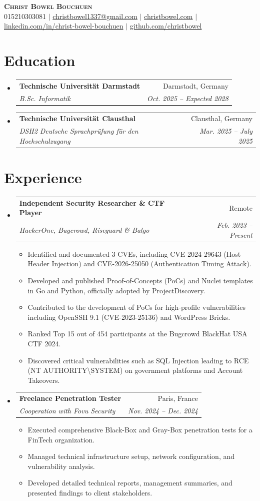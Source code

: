 \documentclass[letterpaper,11pt]{article}
\makeatletter
\newcommand{\resumeItem}[1]{
  \item\small{{#1 \vspace{-2pt}}}
}
\newcommand{\resumeSubheading}[4]{
  \vspace{-2pt}\item
    \begin{tabular*}{0.97\textwidth}[t]{l@{\extracolsep{\fill}}r}
      \textbf{#1} & #2 \\
      \textit{\small#3} & \textit{\small #4} \\
    \end{tabular*}\vspace{-7pt}
}
\newcommand{\resumeSubHeadingListStart}{\begin{itemize}[leftmargin=0.15in, label={}]}
\newcommand{\resumeSubHeadingListEnd}{\end{itemize}}
\newcommand{\resumeItemListStart}{\begin{itemize}}
\newcommand{\resumeItemListEnd}{\end{itemize}\vspace{-5pt}}
\makeatother
\begin{document}
\begin{center}
    \textbf{\Huge \scshape Christ Bowel Bouchuen} \\ \vspace{1pt}
    \small 015210303081 $|$ \href{mailto:christbowel1337@gmail.com}{christbowel1337@gmail.com} $|$ 
    \href{https://christbowel.com}{christbowel.com} $|$
    \href{https://linkedin.com/in/christ-bowel-bouchuen-207a76251}{linkedin.com/in/christ-bowel-bouchuen} $|$
    \href{https://github.com/christbowel}{github.com/christbowel}
\end{center}

\section{Education}
  \resumeSubHeadingListStart
    \resumeSubheading{Technische Universität Darmstadt}{Darmstadt, Germany}{B.Sc. Informatik}{Oct. 2025 -- Expected 2028}
    \resumeSubheading{Technische Universität Clausthal}{Clausthal, Germany}{DSH2 Deutsche Sprachprüfung für den Hochschulzugang}{Mar. 2025 -- July 2025}
  \resumeSubHeadingListEnd

\section{Experience}
  \resumeSubHeadingListStart
    \resumeSubheading{Independent Security Researcher \& CTF Player}{Remote}{HackerOne, Bugcrowd, Riseguard \& Balgo}{Feb. 2023 -- Present}
    \resumeItemListStart
        \resumeItem{Identified and documented 3 CVEs, including CVE-2024-29643 (Host Header Injection) and CVE-2026-25050 (Authentication Timing Attack).}
        \resumeItem{Developed and published Proof-of-Concepts (PoCs) and Nuclei templates in Go and Python, officially adopted by ProjectDiscovery.}
        \resumeItem{Contributed to the development of PoCs for high-profile vulnerabilities including OpenSSH 9.1 (CVE-2023-25136) and WordPress Bricks.}
        \resumeItem{Ranked Top 15 out of 454 participants at the Bugcrowd BlackHat USA CTF 2024.}
        \resumeItem{Discovered critical vulnerabilities such as SQL Injection leading to RCE (NT AUTHORITY\textbackslash{}SYSTEM) on government platforms and Account Takeovers.}
    \resumeItemListEnd

    \resumeSubheading{Freelance Penetration Tester}{Paris, France}{Cooperation with Fovu Security}{Nov. 2024 -- Dec. 2024}
    \resumeItemListStart
        \resumeItem{Executed comprehensive Black-Box and Gray-Box penetration tests for a FinTech organization.}
        \resumeItem{Managed technical infrastructure setup, network configuration, and vulnerability analysis.}
        \resumeItem{Developed detailed technical reports, management summaries, and presented findings to client stakeholders.}
    \resumeItemListEnd
  \resumeSubHeadingListEnd
\end{document}
